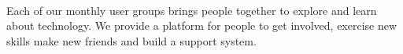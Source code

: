 \documentclass[
  letterpaper,
  DIV=11,
  numbers=noendperiod]{scrartcl}
\begin{document}
\begin{figure}
\begin{minipage}[t]{0.50\linewidth}
{{}

}

\end{minipage}%
%
\begin{minipage}[t]{0.05\linewidth}

{\centering 

~

}

\end{minipage}%
%
\begin{minipage}[t]{0.20\linewidth}

{\centering 


}

\end{minipage}%

\end{figure}

\vspace{-.25\baselineskip}

Each of our monthly user groups brings people together to explore and
learn about technology. We provide a platform for people to get
involved, exercise new skills make new friends and build a support
system.
\end{document}
